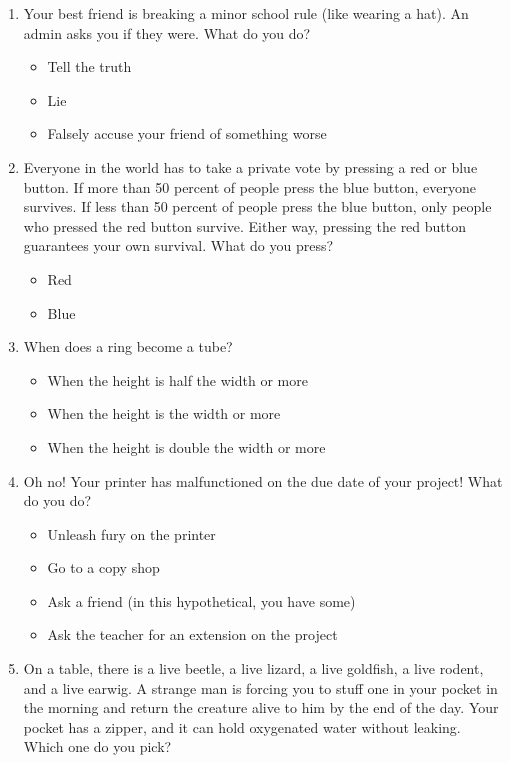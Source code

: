 \documentclass[12pt, letterpaper]{article}
\begin{document}
\begin{enumerate}
\begin{itemize}
        \item Look at it
        \item Don't look at it
        \item Rip it up
        \item Warn the teacher about the answer key
    \end{itemize}
    \item Your best friend is breaking a minor school rule (like wearing a hat). An admin asks you if they were. What do you do?
    \begin{itemize}
        \item Tell the truth
        \item Lie
        \item Falsely accuse your friend of something worse
    \end{itemize}
    \item Everyone in the world has to take a private vote by pressing a red or blue button. If more than 50 percent of people press the blue button, everyone survives. If less than 50 percent of people press the blue button, only people who pressed the red button survive. Either way, pressing the red button guarantees your own survival. What do you press?
    \begin{itemize}
        \item Red
        \item Blue
    \end{itemize}
    \item When does a ring become a tube?
    \begin{itemize}
        \item When the height is half the width or more
        \item When the height is the width or more
        \item When the height is double the width or more
    \end{itemize}
    \item Oh no! Your printer has malfunctioned on the due date of your project! What do you do?
    \begin{itemize}
        \item Unleash fury on the printer
        \item Go to a copy shop
        \item Ask a friend (in this hypothetical, you have some)
        \item Ask the teacher for an extension on the project
    \end{itemize}
    \item On a table, there is a live beetle, a live lizard, a live goldfish, a live rodent, and a live earwig. A strange man is forcing you to stuff one in your pocket in the morning and return the creature alive to him by the end of the day. Your pocket has a zipper, and it can hold oxygenated water without leaking. Which one do you pick?

\end{enumerate}
\end{document}
